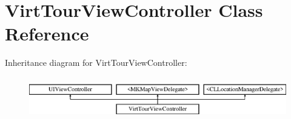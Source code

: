 \hypertarget{interface_virt_tour_view_controller}{\section{Virt\-Tour\-View\-Controller Class Reference}
\label{interface_virt_tour_view_controller}
}
Inheritance diagram for Virt\-Tour\-View\-Controller\-:\begin{figure}[H]
\begin{center}
\leavevmode
\includegraphics[height=1.876047cm]{interface_virt_tour_view_controller}
\end{center}
\end{figure}
